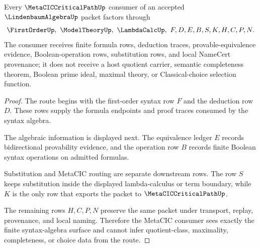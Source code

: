 \begin{theorem}
\label{thm:lindenbaum-algebra-metacic-consumer-route}
Every $\MetaCICCriticalPathUp$ consumer of an accepted $\LindenbaumAlgebraUp$ packet factors through
$$
\FirstOrderUp,\ \ModelTheoryUp,\ \LambdaCalcUp,\ F,D,E,B,S,K,H,C,P,N .
$$
The consumer receives finite formula rows, deduction traces, provable-equivalence evidence, Boolean-operation rows, substitution rows, and local NameCert provenance; it does not receive a host quotient carrier, semantic completeness theorem, Boolean prime ideal, maximal theory, or Classical-choice selection function.
\end{theorem}
\begin{proof}
The route begins with the first-order syntax row $F$ and the deduction row $D$. These rows supply the formula endpoints and proof traces consumed by the syntax algebra.

The algebraic information is displayed next. The equivalence ledger $E$ records bidirectional provability evidence, and the operation row $B$ records finite Boolean syntax operations on admitted formulas.

Substitution and MetaCIC routing are separate downstream rows. The row $S$ keeps substitution inside the displayed lambda-calculus or term boundary, while $K$ is the only row that exports the packet to $\MetaCICCriticalPathUp$.

The remaining rows $H,C,P,N$ preserve the same packet under transport, replay, provenance, and local naming. Therefore the MetaCIC consumer sees exactly the finite syntax-algebra surface and cannot infer quotient-class, maximality, completeness, or choice data from the route.
\end{proof}


\begin{closurestatus}{\LindenbaumAlgebraUp}
  \theoryclosure{\seedClosure}
  \formalstatus{\unformalizedV}
\end{closurestatus}
